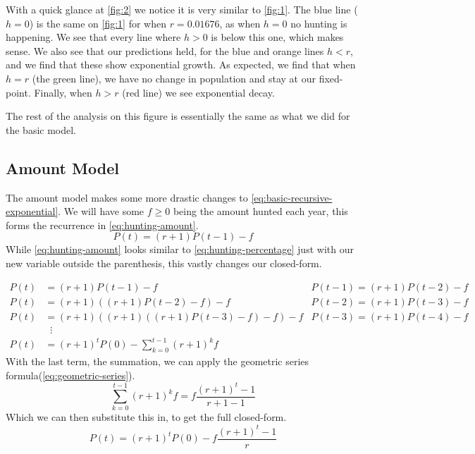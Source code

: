 \documentclass{article}
\begin{document}
With a quick glance at \cref{fig:2} we notice it is very similar to \cref{fig:1}. The blue line ($h=0$) is the same on \cref{fig:1} for when $r=0.01676$, as when $h=0$ no hunting is happening. We see that every line where $h > 0$ is below this one, which makes sense. We also see that our predictions held, for the blue and orange lines $h < r$, and we find that these show exponential growth. As expected, we find that when $h=r$ (the green line), we have no change in population and stay at our fixed-point. Finally, when $h > r$ (red line) we see exponential decay.

The rest of the analysis on this figure is essentially the same as what we did for the basic model.

\subsection{Amount Model}
The amount model makes some more drastic changes to \cref{eq:basic-recursive-exponential}. We will have some $f \ge 0$ being the amount hunted each year, this forms the recurrence in \cref{eq:hunting-amount}.
\begin{equation}\label{eq:hunting-amount}
    P(t) = (r+1)P(t-1) - f
\end{equation}
While \cref{eq:hunting-amount} looks similar to \cref{eq:hunting-percentage} just with our new variable outside the parenthesis, this vastly changes our closed-form.

\begin{align*}
    P(t) &= (r+1)P(t-1) - f & P(t-1) = (r+1)P(t-2) - f \\
    P(t) &= (r+1)((r+1)P(t-2) - f) - f & P(t-2) = (r+1)P(t-3) - f \\
    P(t) &= (r+1)((r+1)((r+1)P(t-3) - f) - f) - f & P(t-3) = (r+1)P(t-4) - f \\
    &\phantom{x}\vdots \\
    P(t) &= (r+1)^tP(0) - \sum_{k=0}^{t-1}(r+1)^kf
\end{align*}
With the last term, the summation, we can apply the geometric series formula(\cref{eq:geometric-series}).
\begin{equation*}
    \sum_{k=0}^{t-1}(r+1)^kf = f\frac{(r+1)^t-1}{r+1-1}
\end{equation*}
Which we can then substitute this in, to get the full closed-form.
\begin{equation}\label{eq:hunting-amount-closed}
     P(t) = (r+1)^tP(0)-f\frac{(r+1)^t-1}{r}
\end{equation}
\end{document}
